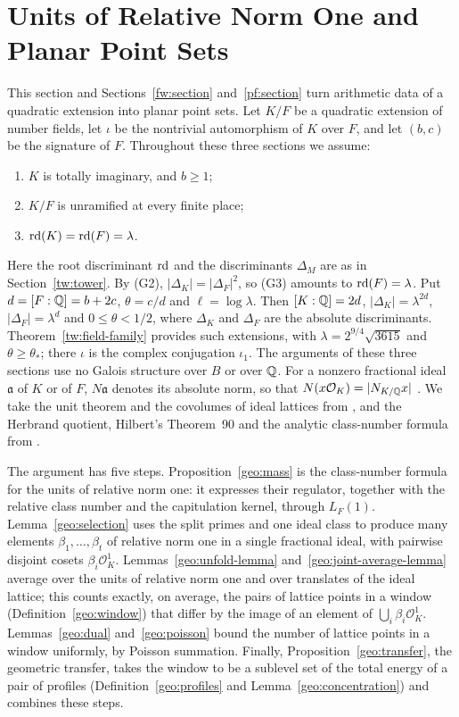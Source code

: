 \section{Units of Relative Norm One and Planar Point Sets}
\label{geo:section}

This section and Sections~\ref{fw:section} and~\ref{pf:section} turn
arithmetic data of a quadratic extension into planar point sets. Let $K/F$ be a quadratic extension of
number fields, let $\iota$ be the nontrivial automorphism of $K$ over
$F$, and let $(b,c)$ be the signature of $F$. Throughout these three
sections we assume:
\begin{enumerate}
\item[(G1)] $K$ is totally imaginary, and $b\ge1$;
\item[(G2)] $K/F$ is unramified at every finite place;
\item[(G3)] $\operatorname{rd}(K)=\operatorname{rd}(F)=\lambda$.
\end{enumerate}
Here the root discriminant $\operatorname{rd}$ and the discriminants $\Delta_M$ are as in
Section~\ref{tw:tower}. By (G2), $|\Delta_K|=|\Delta_F|^2$, so (G3) amounts
to $\operatorname{rd}(F)=\lambda$.
Put $d=[F:\mathbb Q]=b+2c$, $\theta=c/d$ and $\ell=\log\lambda$. Then
$[K:\mathbb Q]=2d$, $|\Delta_K|=\lambda^{2d}$, $|\Delta_F|=\lambda^d$ and
$0\le\theta<1/2$, where $\Delta_K$ and $\Delta_F$ are the absolute
discriminants. Theorem~\ref{tw:field-family} provides such extensions,
with $\lambda=2^{9/4}\sqrt{3615}$ and $\theta\ge\theta_*$; there $\iota$
is the complex conjugation $\iota_1$. The arguments of these three
sections use no Galois structure over $B$ or over $\mathbb Q$. For a nonzero
fractional ideal $\mathfrak a$ of $K$ or of $F$, $N\mathfrak a$ denotes
its absolute norm, so that $N(x\mathcal O_K)=|N_{K/\mathbb Q}x|$
\cite[Propositions~4.1 and~4.2]{MilneANT}. We take the unit theorem and
the covolumes of ideal lattices from \cite{MilneANT}, and the Herbrand
quotient, Hilbert's Theorem~90 and the analytic class-number formula
from \cite{MilneCFT}.

The argument has five steps. Proposition~\ref{geo:mass} is the
class-number formula for the units of relative norm one: it expresses
their regulator, together with the relative class number and the
capitulation kernel, through $L_F(1)$. Lemma~\ref{geo:selection} uses the
split primes and one ideal class to produce many elements
$\beta_1,\dots,\beta_t$ of relative norm one in a single fractional ideal,
with pairwise disjoint cosets $\beta_i\mathcal O_K^1$.
Lemmas~\ref{geo:unfold-lemma} and~\ref{geo:joint-average-lemma} average
over the units of relative norm one and over translates of the ideal
lattice; this counts exactly, on average, the pairs of lattice points in a
window (Definition~\ref{geo:window}) that differ by the image of an element
of $\bigcup_i\beta_i\mathcal O_K^1$. Lemmas~\ref{geo:dual}
and~\ref{geo:poisson} bound the number of lattice points in a window
uniformly, by Poisson summation. Finally, Proposition~\ref{geo:transfer},
the geometric transfer, takes the window to be a sublevel set of the total
energy of a pair of profiles (Definition~\ref{geo:profiles} and
Lemma~\ref{geo:concentration}) and combines these steps.

